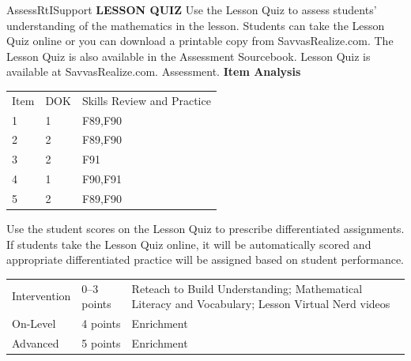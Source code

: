 \documentclass{article}
\newenvironment{te-addendum}[2]{}{}     %
\begin{document}
\begin{te-addendum}{Assess}{RtISupport}
\textbf{LESSON QUIZ}
Use the Lesson Quiz to assess students' understanding of the mathematics in the lesson.
Students can take the Lesson Quiz online or you can download a printable copy from SavvasRealize.com. The Lesson Quiz is also available in the Assessment Sourcebook.
Lesson Quiz is available at SavvasRealize.com. Assessment.
\textbf{Item Analysis}
\begin{tabular}{lll}
Item & DOK & Skills Review and Practice \\
1 & 1 & F89,F90 \\
2 & 2 & F89,F90 \\
3 & 2 & F91 \\
4 & 1 & F90,F91 \\
5 & 2 & F89,F90 \\
\end{tabular}
Use the student scores on the Lesson Quiz to prescribe differentiated assignments.
If students take the Lesson Quiz online, it will be automatically scored and appropriate differentiated practice will be assigned based on student performance.
\begin{tabular}{lll}
Intervention & 0--3 points & Reteach to Build Understanding; Mathematical Literacy and Vocabulary; Lesson Virtual Nerd videos \\
On-Level & 4 points & Enrichment \\
Advanced & 5 points & Enrichment \\
\end{tabular}
\end{te-addendum}
\end{document}
